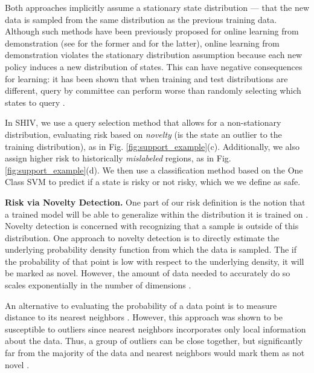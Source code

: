 \documentclass[10pt, conference]{ieeeconf}      %
\begin{document}
Both approaches implicitly assume a stationary state distribution --- that the new data is sampled from the same distribution as the previous training data. Although such methods have been previously proposed for online learning from demonstration (see \cite{chernova2009interactive,grollman2007dogged} for the former and \cite{judah2011active,judah2012active} for the latter),
online learning from demonstration violates the stationary distribution assumption because each new policy induces a new distribution of states. This can have negative consequences for learning: it has been shown that when training and test distributions are different, query by committee can perform worse than randomly selecting  which states to query \cite{burbidge2007active}.

In SHIV, we use a query selection method that allows for a non-stationary distribution, evaluating risk based on \emph{novelty} (is the state an outlier to the training distribution), as in Fig. \ref{fig:support_example}(c). Additionally, we also assign higher risk to  historically \emph{mislabeled} regions, as in Fig. \ref{fig:support_example}(d). We then use a classification method based on the One Class SVM \cite{scholkopf2001estimating} to predict if a state is risky or not risky, which we we define as safe.%

\noindent\textbf{Risk via Novelty Detection.}
One part of our risk definition is the notion that a trained model will be able to generalize within the distribution it is
trained on \cite{tokdar2010importance}. Novelty detection \cite{hodge2004survey} is concerned with recognizing that a sample is outside of this distribution.
One approach to novelty detection is to directly estimate the underlying probability density function from which the data is sampled. The if the probability of that point is low with respect to the underlying density, it will be marked as novel. However, the amount of data needed to accurately do so scales exponentially in the number of dimensions \cite{nadaraya1964estimating}.

An alternative to evaluating the probability of a data point is to measure distance to its nearest neighbors \cite{knox1998algorithms}. However, this approach was shown to be
susceptible to outliers since nearest neighbors  incorporates only local information about the data. Thus, a group of outliers can be close together, but significantly far from the majority of the data and nearest neighbors would mark them as not novel \cite{hodge2004survey}.
\end{document}
